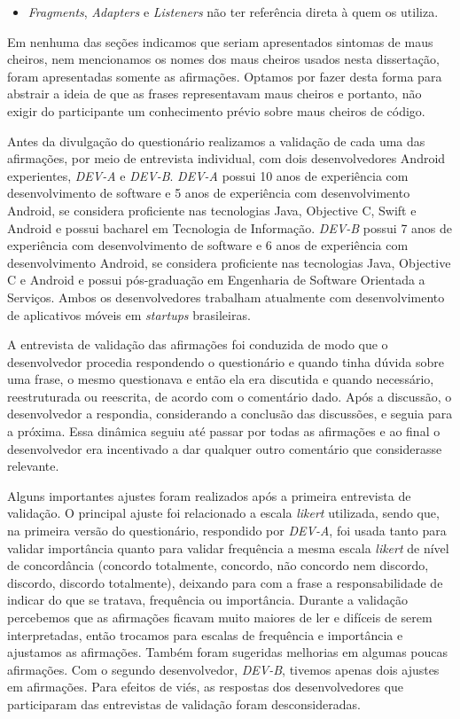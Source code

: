 \begin{itemize}
  \item \textit{Fragments}, \textit{Adapters} e \textit{Listeners} não ter referência direta à quem os utiliza.
\end{itemize}

Em nenhuma das seções indicamos que seriam apresentados sintomas de maus cheiros, nem mencionamos os nomes dos maus cheiros usados nesta dissertação, foram apresentadas somente as afirmações. Optamos por fazer desta forma para abstrair a ideia de que as frases representavam maus cheiros e portanto, não exigir do participante um conhecimento prévio sobre maus cheiros de código.

Antes da divulgação do questionário realizamos a validação de cada uma das afirmações, por meio de entrevista individual, com dois desenvolvedores Android experientes, \emph{DEV-A} e \emph{DEV-B}. \emph{DEV-A} possui 10 anos de experiência com desenvolvimento de software e 5 anos de experiência com desenvolvimento Android, se considera proficiente nas tecnologias Java, Objective C, Swift e Android e possui bacharel em Tecnologia de Informação. \emph{DEV-B} possui 7 anos de experiência com desenvolvimento de software e 6 anos de experiência com desenvolvimento Android, se considera proficiente nas tecnologias Java, Objective C e Android e possui pós-graduação em Engenharia de Software Orientada a Serviços. Ambos os desenvolvedores trabalham atualmente com desenvolvimento de aplicativos móveis em \textit{startups} brasileiras. 

A entrevista de validação das afirmações foi conduzida de modo que o desenvolvedor procedia respondendo o questionário e quando tinha dúvida sobre uma frase, o mesmo questionava e então ela era discutida e quando necessário, reestruturada ou reescrita, de acordo com o comentário dado. Após a discussão, o desenvolvedor a respondia, considerando a conclusão das discussões, e seguia para a próxima. Essa dinâmica seguiu até passar por todas as afirmações e ao final o desenvolvedor era incentivado a dar qualquer outro comentário que considerasse relevante. 

Alguns importantes ajustes foram realizados após a primeira entrevista de validação. O principal ajuste foi relacionado a escala \textit{likert} utilizada, sendo que, na primeira versão do questionário, respondido por \emph{DEV-A}, foi usada tanto para validar importância quanto para validar frequência a mesma escala \textit{likert} de nível de concordância (concordo totalmente, concordo, não concordo nem discordo, discordo, discordo totalmente), deixando para com a frase a responsabilidade de indicar do que se tratava, frequência ou importância. Durante a validação percebemos que as afirmações ficavam muito maiores de ler e difíceis de serem interpretadas, então trocamos para escalas de frequência e importância e ajustamos as afirmações. Também foram sugeridas melhorias em algumas poucas afirmações. Com o segundo desenvolvedor, \emph{DEV-B}, tivemos apenas dois ajustes em afirmações. Para efeitos de viés, as respostas dos desenvolvedores que participaram das entrevistas de validação foram desconsideradas.

